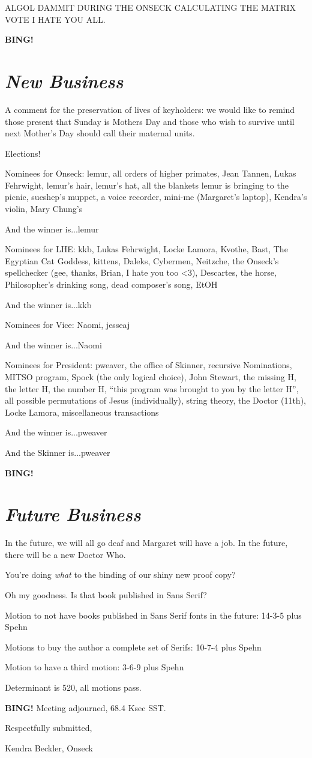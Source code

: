 \documentclass[10pt]{article}
\newcommand{\bing}{{\bf BING!} }
\newcommand{\goto}[1]{\bing \vskip 12pt \section*{{\em{#1}}}}
\newcommand{\ps}{ plus Spehn\xspace}
\newcommand{\onseck}{Kendra Beckler, Onseck}
\begin{document}
ALGOL DAMMIT DURING THE ONSECK CALCULATING THE MATRIX VOTE I HATE YOU ALL.

\goto{New Business}

A comment for the preservation of lives of keyholders: we would like to remind those present that Sunday is Mothers Day and those who wish to survive until next Mother's Day should call their maternal units.

Elections!

Nominees for Onseck: lemur, all orders of higher primates, Jean Tannen, Lukas Fehrwight, lemur's hair, lemur's hat, all the blankets lemur is bringing to the picnic, sueshep's muppet, a voice recorder, mini-me (Margaret's laptop), Kendra's violin, Mary Chung's

And the winner is...lemur

Nominees for LHE: kkb, Lukas Fehrwight, Locke Lamora, Kvothe, Bast, The Egyptian Cat Goddess, kittens, Daleks, Cybermen, Neitzche, the Onseck's spellchecker (gee, thanks, Brian, I hate you too <3), Descartes, the horse, Philosopher's drinking song, dead composer's song, EtOH

And the winner is...kkb

Nominees for Vice: Naomi, jesseaj

And the winner is...Naomi

Nominees for President: pweaver, the office of Skinner, recursive Nominations, MITSO program, Spock (the only logical choice), John Stewart, the missing H, the letter H, the number H, ``this program was brought to you by the letter H'', all possible permutations of Jesus (individually), string theory, the Doctor (11th), Locke Lamora, miscellaneous transactions

And the winner is...pweaver

And the Skinner is...pweaver

\goto{Future Business}

In the future, we will all go deaf and Margaret will have a job.  In the future, there will be a new Doctor Who.

You're doing \textit{what} to the binding of our shiny new proof copy?

Oh my goodness.  Is that book published in Sans Serif?

Motion to not have books published in Sans Serif fonts in the future: 14-3-5 \ps

Motions to buy the author a complete set of Serifs: 10-7-4 \ps

Motion to have a third motion: 3-6-9 \ps

Determinant is 520, all motions pass.

\bing
\noindent
Meeting adjourned, 68.4 Ksec SST.

\vspace{18pt}

\centerline{Respectfully submitted,}
\centerline{\onseck}
\end{document}
